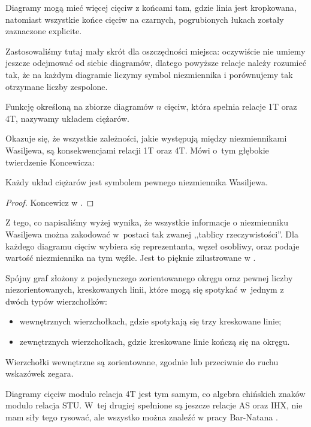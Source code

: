 Diagramy mogą mieć więcej cięciw z końcami tam, gdzie linia jest kropkowana, natomiast wszystkie końce cięciw na czarnych, pogrubionych łukach zostały zaznaczone explicite.

Zastosowaliśmy tutaj mały skrót dla oszczędności miejsca: oczywiście nie umiemy jeszcze odejmować od siebie diagramów, dlatego powyższe relacje należy rozumieć tak, że na każdym diagramie liczymy symbol niezmiennika i porównujemy tak otrzymane liczby zespolone.

\begin{definition}
%
    Funkcję określoną na zbiorze diagramów $n$ cięciw, która spełnia relacje 1T oraz 4T, nazywamy układem ciężarów.
\end{definition}

Okazuje się, że wszystkie zależności, jakie występują między niezmiennikami Wasiljewa, są konsekwencjami relacji 1T oraz 4T.
Mówi o~tym głębokie twierdzenie Koncewicza:

\begin{proposition}
    Każdy układ ciężarów jest symbolem pewnego niezmiennika Wasiljewa. %
\end{proposition}

\begin{proof}
    Koncewicz w \cite{kontsevich93}. %
\end{proof}

Z tego, co napisaliśmy wyżej wynika, że wszystkie informacje o niezmienniku Wasiljewa można zakodować w~postaci tak zwanej ,,tablicy rzeczywistości''.
Dla każdego diagramu cięciw wybiera się reprezentanta, węzeł osobliwy, oraz podaje wartość niezmiennika na tym węźle.
Jest to pięknie zilustrowane w \cite[sekcja 3.7]{duzhin12}.

\begin{definition}
    Spójny graf złożony z pojedynczego zorientowanego okręgu oraz pewnej liczby niezorientowanych, kreskowanych linii, które mogą się spotykać w~jednym z dwóch typów wierzchołków:
    \begin{itemize}
        \item wewnętrznych wierzchołkach, gdzie spotykają się trzy kreskowane linie;
        \item zewnętrznych wierzchołkach, gdzie kreskowane linie kończą się na okręgu.
    \end{itemize}
    Wierzchołki wewnętrzne są zorientowane, zgodnie lub przeciwnie do ruchu wskazówek zegara.
\end{definition}

Diagramy cięciw modulo relacja 4T jest tym samym, co algebra chińskich znaków modulo relacja STU.
%
%
W~tej drugiej spełnione są jeszcze relacje AS oraz IHX, nie mam siły tego rysować, ale wszystko można znaleźć w pracy Bar-Natana \cite{barnatan_95}.
%

